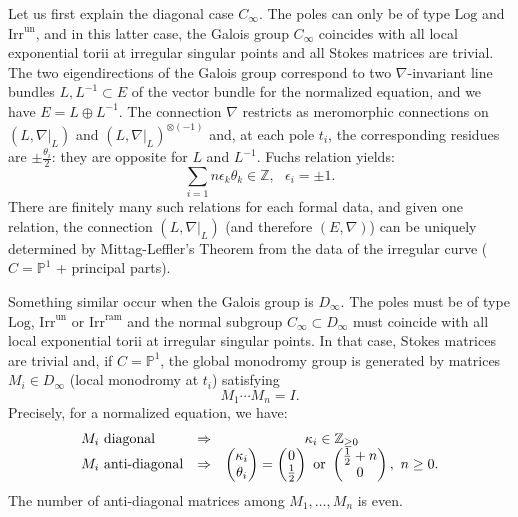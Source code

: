 \documentclass[12]{amsart}
\newcommand{\Log}{\boldsymbol{\mathrm{Log}}}
\newcommand{\Irrun}{\boldsymbol{\mathrm{Irr}^{\mathrm{un}}}}
\newcommand{\Irram}{\boldsymbol{\mathrm{Irr}^{\mathrm{ram}}}}
\begin{document}
Let us first explain the diagonal case $C_\infty$. 
The poles can only be of type $\Log$ and $\Irrun$, and in this latter case, 
the Galois group $C_\infty$ coincides with all local exponential torii at irregular singular points
and all Stokes matrices are trivial. The two eigendirections of the Galois group correspond to 
two $\nabla$-invariant line bundles $L,L^{-1}\subset E$ of the vector bundle for the normalized equation,
and we have $E=L\oplus L^{-1}$.
The connection $\nabla$ restricts as meromorphic connections on $(L,\nabla\vert_L)$ and $(L,\nabla\vert_L)^{\otimes(-1)}$ 
and, at each pole $t_i$,
the corresponding residues are $\pm\frac{\theta_i}{2}$: they are opposite for $L$ and $L^{-1}$.
Fuchs relation yields:
$$\sum_{i=1}{n}\epsilon_k\theta_k\in\mathbb Z,\ \ \ \epsilon_i=\pm1.$$
There are finitely many such relations for each formal data, and given one relation,
the connection $(L,\nabla\vert_L)$ (and therefore $(E,\nabla)$) can be uniquely determined by Mittag-Leffler's Theorem
from the data of the irregular curve ($C=\mathbb P^1$ + principal parts). 

Something similar occur when the Galois group is $D_\infty$. The poles must be of type $\Log$, $\Irrun$ or $\Irram$
and the normal subgroup $C_\infty\subset D_\infty$ must coincide with all local exponential torii at irregular singular points.
In that case, Stokes matrices are trivial and, if $C=\mathbb P^1$, the global monodromy group is generated by matrices $M_i\in D_\infty$
(local monodromy at $t_i$) satisfying
$$M_1\cdots M_n=I.$$
Precisely, for a normalized equation, we have:
$$
\begin{matrix}
M_i\ \text{diagonal}\hfill\hfill  & \Rightarrow & \kappa_i\in\mathbb Z_{\ge0}\\
M_i\ \text{anti-diagonal} & \Rightarrow &
\begin{pmatrix}\kappa_i\\ \theta_i\end{pmatrix}=\begin{pmatrix}0\\ \frac{1}{2}\end{pmatrix}\ \text{or}\ \begin{pmatrix}\frac{1}{2}+n\\0\end{pmatrix},\ n\ge0.
\end{matrix}
$$
The number of anti-diagonal matrices among $M_1,\ldots,M_n$ is even.
\end{document}

